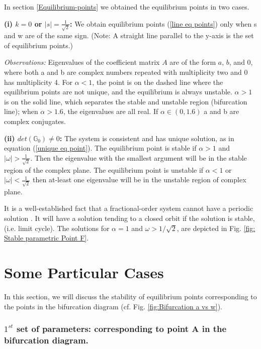 \documentclass[pdflatex,sn-mathphys]{sn-jnl}%
\theoremstyle{thmstyleone}%
\theoremstyle{thmstyletwo}%
\theoremstyle{thmstylethree}%
\begin{document}
In section \ref{Equilibrium-points} we obtained the equilibrium points in two cases.

\textbf{(i) $k=0$ or $|s|=\frac{1}{\sqrt{2}}$:} We obtain equilibrium points (\ref{line eq points}) only when s and w are of the same sign. (Note: A straight line parallel to the y-axis is the set of equilibrium points.)

\textit{Observations:} Eigenvalues of the coefficient matrix $A$ are of the form $a$, $b$, and $0$, where both a and b are complex numbers repeated with multiplicity two and $0$ has multiplicity 4. 
For $\alpha<1$, the point is on the dashed line where the equilibrium points are not unique, and the equilibrium is always unstable. $\alpha>1$ is on the solid line, which separates the stable and unstable region (bifurcation line); when $\alpha>1.6$, the eigenvalues are all real.  If $\alpha \in (0,1.6)$ a and b are complex conjugates.

\textbf{(ii) $det(\mathbb{G}_{0})\neq 0 $:}
The system is consistent and has unique solution, as in equation (\ref{unique eq point}).
The equilibrium point is stable if $\alpha>1$ and $\vert \omega\vert >\frac{1}{\sqrt{2}}$. Then the eigenvalue with the smallest argument will be in the stable region of the complex plane. The equilibrium point is unstable if $\alpha<1$ or $\vert\omega\vert <\frac{1}{\sqrt{2}}$ then at-least one eigenvalue will be in the unstable region of complex plane.

It is a well-established fact that a fractional-order system cannot have a periodic solution \cite{kaslik2012non}. It will have a solution tending to a closed orbit if the solution is stable, (i.e. limit cycle). The solutions for $\alpha=1$ and $\omega>1/\sqrt{2}$, are depicted in Fig. \ref{fig: Stable parametric Point F}.
\section{Some Particular Cases}\label{Some Particular cases}
In this section, we will discuss the stability of equilibrium points corresponding to the points in the bifurcation diagram (cf. Fig. \ref{fig:Bifurcation a vs w}).

\subsubsection{$1^{st}$ set of parameters: corresponding to point A in the bifurcation diagram.}
\label{$1{st}$ set}
\end{document}
